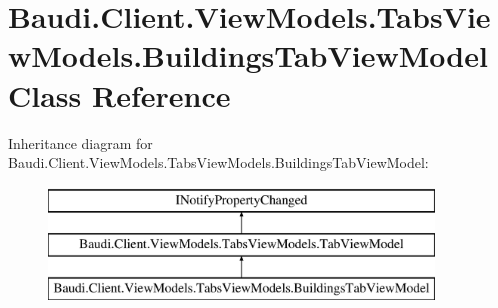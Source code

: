 \hypertarget{class_baudi_1_1_client_1_1_view_models_1_1_tabs_view_models_1_1_buildings_tab_view_model}{}\section{Baudi.\+Client.\+View\+Models.\+Tabs\+View\+Models.\+Buildings\+Tab\+View\+Model Class Reference}
\label{class_baudi_1_1_client_1_1_view_models_1_1_tabs_view_models_1_1_buildings_tab_view_model}
Inheritance diagram for Baudi.\+Client.\+View\+Models.\+Tabs\+View\+Models.\+Buildings\+Tab\+View\+Model\+:\begin{figure}[H]
\begin{center}
\leavevmode
\includegraphics[height=3.000000cm]{class_baudi_1_1_client_1_1_view_models_1_1_tabs_view_models_1_1_buildings_tab_view_model}
\end{center}
\end{figure}
